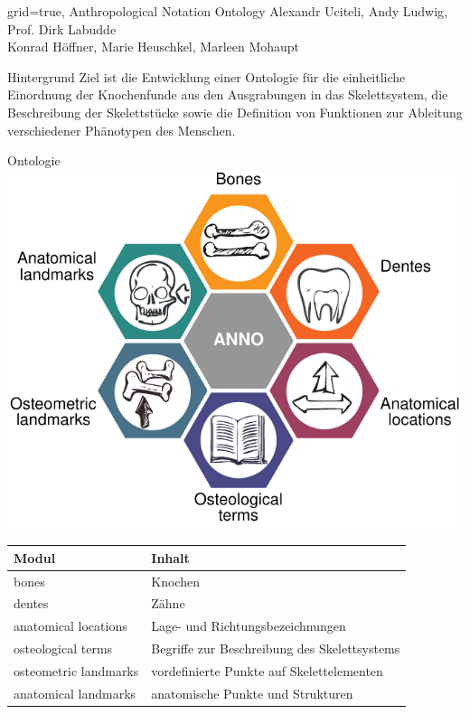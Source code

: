 \documentclass[portrait,final,a0paper,fontscale=0.320]{imiseposter}
\begin{document}
\begin{poster}%
  {grid=true,}
  {}
  {Anthropological Notation Ontology}
  {Alexandr Uciteli, Andy Ludwig, Prof. Dirk Labudde\\Konrad Höffner, Marie Heuschkel, Marleen Mohaupt}
  {%
  }

\begin{posterbox}[name=background,column=0,row=0]{Hintergrund}
Ziel ist die Entwicklung einer Ontologie für die einheitliche Einordnung der Knochenfunde aus den Ausgrabungen in das Skelettsystem, die Beschreibung der Skelettstücke sowie die Definition von Funktionen zur Ableitung verschiedener Phänotypen des Menschen. 
\end{posterbox}
\begin{posterbox}[name=ontology,below=background]{Ontologie}
\includegraphics[width=\textwidth]{img/anno.pdf}
\begin{tabular}{ll}
\toprule
\textbf{Modul}			&\textbf{Inhalt}\\
\midrule
bones					&Knochen\\
dentes					&Zähne\\
anatomical locations	&Lage- und Richtungsbezeichnungen\\
osteological terms		&Begriffe zur Beschreibung des Skelettsystems\\
osteometric landmarks	&vordefinierte Punkte auf Skelettelementen\\
anatomical landmarks	&anatomische Punkte und Strukturen\\
\bottomrule
\end{tabular}


\end{posterbox}
\end{poster}
\end{document}
